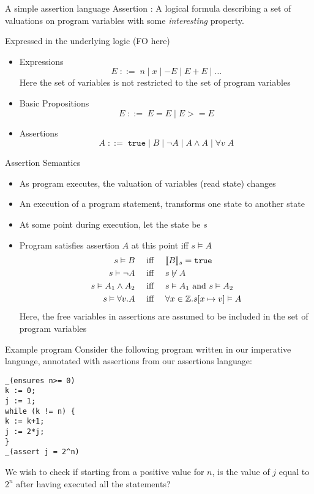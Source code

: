 \documentclass[presentation]{beamer}
\begin{document}
\begin{frame}[label={sec:orga1d6c44}]{A simple assertion language}
\alert{Assertion} : A logical formula describing a set of valuations on program variables with some
\emph{interesting} property.

Expressed in the underlying logic (FO here)

\begin{itemize}
\item Expressions
\begin{equation*}
E\;::=\;n\mid x\mid -E\mid E+E\mid\dots
\end{equation*}
Here the set of variables is not restricted to the set of program variables
\item Basic Propositions
\begin{equation*}
E\;::=\; E=E\mid E>= E
\end{equation*}
\item Assertions
\begin{equation*}
A\;::=\;\texttt{true}\mid B\mid\neg A\mid A\wedge A\mid\forall v\;A
\end{equation*}
\end{itemize}
\end{frame}
\begin{frame}[label={sec:org1fb7fcc}]{Assertion Semantics}
\begin{itemize}
\item As program executes, the valuation of variables (read \alert{state}) changes
\item An execution of a program statement, transforms one state to another state
\item At some point during execution, let the state be \(s\)
\item Program satisfies assertion \(A\) at this point iff \(s\vDash A\)
\begin{align*}
s\vDash B&\quad\text{ iff }\quad\llbracket B \rrbracket_s=\texttt{true}\\
s\vDash\neg A&\quad\text{ iff }\quad s\not\vDash A\\
s\vDash A_1\wedge A_2&\quad\text{ iff }\quad s\vDash A_1\text{ and }s\vDash A_2\\
s\vDash\forall v.A&\quad\text{ iff }\quad \forall x\in\mathbb{Z}.s[x\mapsto v]\vDash A
\end{align*}
Here, the free variables in assertions are assumed to be included in the set of program variables
\end{itemize}
\end{frame}
\begin{frame}[label={sec:org724fdbe},fragile]{Example program}
 Consider the following program written in our imperative language, annotated with assertions
from our assertions language:
\begin{verbatim}
_(ensures n>= 0)
k := 0;
j := 1;
while (k != n) {
k := k+1;
j := 2*j;
}
_(assert j = 2^n)
\end{verbatim}

We wish to check if starting from a positive value for \(n\), is the value of \(j\) equal
to \(2^n\) after having executed all the statements?
\end{frame}
\end{document}
